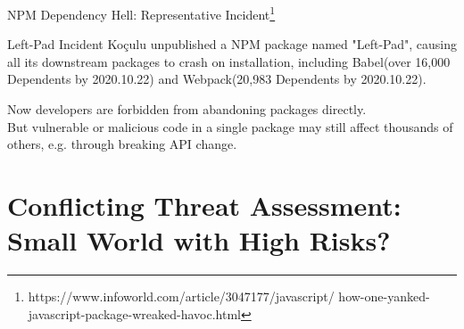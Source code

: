 \documentclass{beamer}
\begin{document}
\begin{frame}{NPM Dependency Hell: Representative Incident\footnote{https://www.infoworld.com/article/3047177/javascript/
how-one-yanked-javascript-package-wreaked-havoc.html}}
\begin{alertblock}{Left-Pad Incident}
Koçulu \alert{unpublished} a NPM package named "Left-Pad", causing all its downstream packages to \alert{crash} on installation, including \alert{Babel}(over 16,000 Dependents by 2020.10.22) and \alert{Webpack}(20,983 Dependents by 2020.10.22).
\end{alertblock}
Now developers are forbidden from abandoning packages directly. \\But vulnerable or malicious code in a single package may still affect thousands of others, e.g. through breaking API change.
\end{frame}

\section{Conflicting Threat Assessment: Small World with High Risks?}
\end{document}
